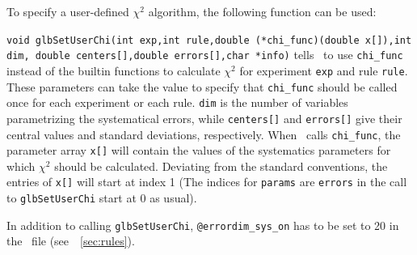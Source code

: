 To specify a user-defined $\chi^2$ algorithm, the following function can be used:
\begin{function}
{\tt void glbSetUserChi(int exp,int rule,double (*chi\_func)(double x[]),int dim,%
double centers[],double errors[],char *info)} tells \GLOBES\ to use {\tt chi\_func}
instead of the builtin functions to calculate $\chi^2$ for experiment {\tt exp} and
rule {\tt rule}. These parameters can take the value  to specify that
{\tt chi\_func} should be called once for each experiment or each rule. {\tt dim} is
the number of variables parametrizing the systematical errors, while {\tt centers[]}
and {\tt errors[]} give their central values and standard deviations, respectively.
When \GLOBES\ calls {\tt chi\_func}, the parameter array {\tt x[]} will contain
the values of the systematics parameters for which $\chi^2$ should be calculated.
Deviating from the standard conventions, the entries of {\tt x[]} will start at index 1
(The indices for {\tt params} are {\tt errors} in the call to {\tt glbSetUserChi} start
at 0 as usual).
\end{function}

In addition to calling {\tt glbSetUserChi}, {\tt @errordim\_sys\_on} has to be set
to 20 in the \AEDL\ file (see~\Sec~\ref{sec:rules}).

